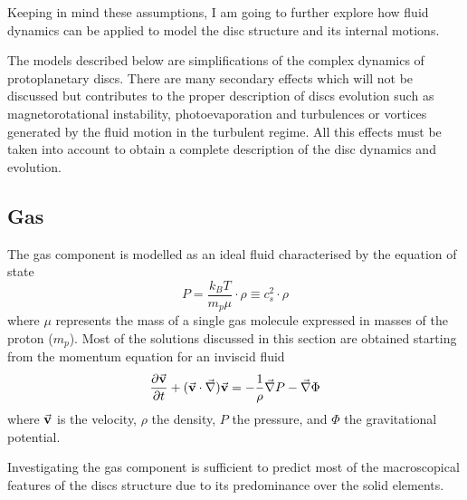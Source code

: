 \documentclass[a4paper,10pt]{report}
\begin{document}
Keeping in mind these assumptions, I am going to further explore how fluid dynamics can be applied to model the disc 
structure and its internal motions.

The models described below are simplifications of the complex dynamics of protoplanetary discs. 
There are many secondary effects which will not be discussed but
contributes to the proper description of discs evolution such as magnetorotational instability, photoevaporation and 
turbulences or vortices generated by the fluid motion in the turbulent regime. All 
this effects must be taken into account to obtain a complete description of the disc dynamics and evolution.

\subsection{Gas}

The gas component is modelled as an ideal fluid characterised
by the equation of state
\begin{equation}
    P = \frac{k_BT}{m_p\mu}\cdot \rho \equiv c_s^2 \cdot \rho
\end{equation}
where $\mu$ represents the mass of a single gas molecule expressed in masses of the proton ($m_p$).
Most of the solutions discussed in this section are obtained starting from the momentum equation
for an inviscid fluid
\begin{equation}
    \pdv{\va{v}}{t} + (\va{v}\cdot \va\nabla)\va{v} = -\frac{1}{\rho}\va  \nabla P - \va \nabla \Phi
\end{equation}
where $\va v$ is the velocity, $\rho$ the density, $P$ the pressure, and $\Phi$ the gravitational potential.

Investigating the gas component is sufficient to predict most of the macroscopical features of the discs structure due to its
predominance over the solid elements. 
\end{document}
